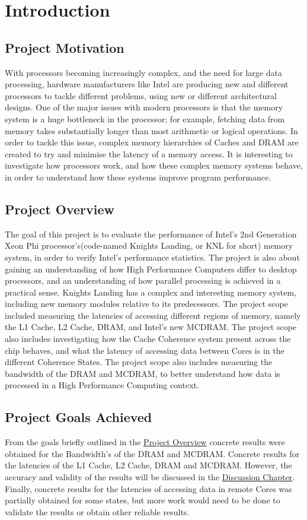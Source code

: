 \documentclass[bsc,frontabs,twoside,singlespacing,parskip,deptreport]{infthesis}     %
\begin{document}

\chapter{Introduction}
\section{Project Motivation}
With processors becoming increasingly complex, and the need for large data processing, hardware manufacturers like Intel are producing new and different processors to tackle different problems, using new or different architectural designs. One of the major issues with modern processors is that the memory system is a huge bottleneck in the processor; for example, fetching data from memory takes substantially longer than most arithmetic or logical operations. In order to tackle this issue, complex memory hierarchies of Caches and DRAM are created to try and minimise the latency of a memory access. It is interesting to investigate how processors work, and how these complex memory systems behave, in order to understand how these systems improve program performance.

\section{Project Overview}\label{proj-overview}
The goal of this project is to evaluate the performance of Intel's 2nd Generation Xeon Phi processor's(code-named Knights Landing, or KNL for short) memory system, in order to verify Intel's performance statistics. The project is also about gaining an understanding of how High Performance Computers differ to desktop processors, and an understanding of how parallel processing is achieved in a practical sense. Knights Landing has a complex and interesting memory system, including new memory modules relative to its predecessors. The project scope included measuring the latencies of accessing different regions of memory, namely the L1 Cache, L2 Cache, DRAM, and Intel's new MCDRAM. The project scope also includes investigating how the Cache Coherence system present across the chip behaves, and what the latency of accessing data between Cores is in the different Coherence States. The project scope also includes measuring the bandwidth of the DRAM and MCDRAM, to better understand how data is processed in a High Performance Computing context.

\section{Project Goals Achieved}
From the goals briefly outlined in the \hyperref[proj-overview]{Project Overview} concrete results were obtained for the Bandwidth's of the DRAM and MCDRAM. Concrete results for the latencies of the L1 Cache, L2 Cache, DRAM and MCDRAM. However, the accuracy and validity of the results will be discussed in the \hyperref[chap:discussion]{Discussion Chapter}. Finally, concrete results for the latencies of accessing data in remote Cores was partially obtained for some states, but more work would need to be done to validate the results or obtain other reliable results.
\end{document}
